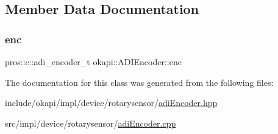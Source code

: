 \subsection{Member Data Documentation}
\mbox{\label{classokapi_1_1ADIEncoder_a73a94af6c2622b5cc8c30e6f99e20b44}} 
\subsubsection{\texorpdfstring{enc}{enc}}
{\footnotesize\ttfamily pros\+::c\+::adi\+\_\+encoder\+\_\+t okapi\+::\+A\+D\+I\+Encoder\+::enc\hspace{0.3cm}{\ttfamily [protected]}}



The documentation for this class was generated from the following files\+:\begin{DoxyCompactItemize}
\item 
include/okapi/impl/device/rotarysensor/\mbox{\hyperlink{adiEncoder_8hpp}{adi\+Encoder.\+hpp}}\item 
src/impl/device/rotarysensor/\mbox{\hyperlink{adiEncoder_8cpp}{adi\+Encoder.\+cpp}}\end{DoxyCompactItemize}
